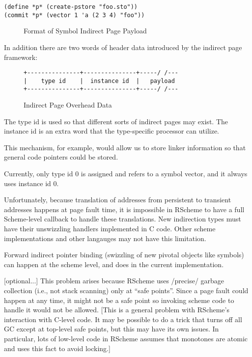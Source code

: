 \documentclass[10pt,letterpaper]{article}
\begin{document}
\begin{verbatim}
(define *p* (create-pstore "foo.sto"))
(commit *p* (vector 1 'a (2 3 4) "foo"))
\end{verbatim}

\begin{figure}
\centering
{}
\caption{Format of Symbol Indirect Page Payload}
\end{figure}

In addition there are two words of header data introduced by the
indirect page framework:

\begin{figure}
\begin{verbatim}
+---------------+---------------+-----/ /---
|    type id    |  instance id  |   payload
+---------------+---------------+-----/ /---
\end{verbatim}
\caption{Indirect Page Overhead Data}
\end{figure}

The type id is used so that different sorts of indirect pages may
exist.  The instance id is an extra word that the type-specific
processor can utilize.

This mechanism, for example, would allow us to store linker information
so that general code pointers could be stored.

Currently, only type id 0 is assigned and refers to a symbol vector,
and it always uses instance id 0.

Unfortunately, because translation of addresses from persistent
to transient addresses happens at page fault time, it is impossible
in RScheme to have a full Scheme-level callback to handle these
translations.  New indirection types must have their unswizzling
handlers implemented in C code.  Other scheme implementations and
other langauges may not have this limitation.

Forward indirect pointer binding (swizzling of new pivotal objects
like symbols) can happen at the scheme level, and does in the current
implementation.

[optional...] This problem arises because RScheme uses /precise/
garbage collection (i.e., not stack scanning) only at ``safe points''.
Since a page fault could happen at any time, it might not be a safe
point so invoking scheme code to handle it would not be allowed.
[This is a general problem with RScheme's interaction with C-level
code.  It may be possible to do a trick that turns off all GC except
at top-level safe points, but this may have its own issues.  In
particular, lots of low-level code in RScheme assumes that monotones
are atomic and uses this fact to avoid locking.]
\end{document}
